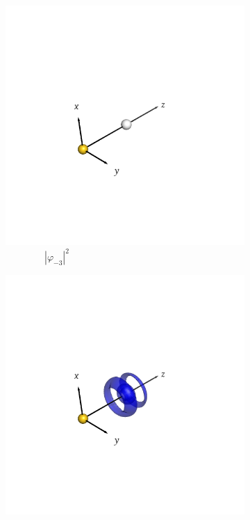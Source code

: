 \documentclass[journal=inoraj,manuscript=article]{achemso}
\begin{document}
\begin{figure}[!h]
    \vspace{0.0cm}
    \begin{subfigure}[t]{0.32\textwidth}
        \centering
        \includegraphics[width=\linewidth]{./AuOg+/nocv-5.png} 
        \caption*{\ \ \ \ \ \ \ \ $|\varphi_{-3}|^2$} 
    \end{subfigure}
    \hfill
    \begin{subfigure}[t]{0.32\textwidth}
        \centering
        \includegraphics[width=\linewidth]{./AuOg+/nocv+5.png} 

\end{subfigure}
\end{figure}
\end{document}
